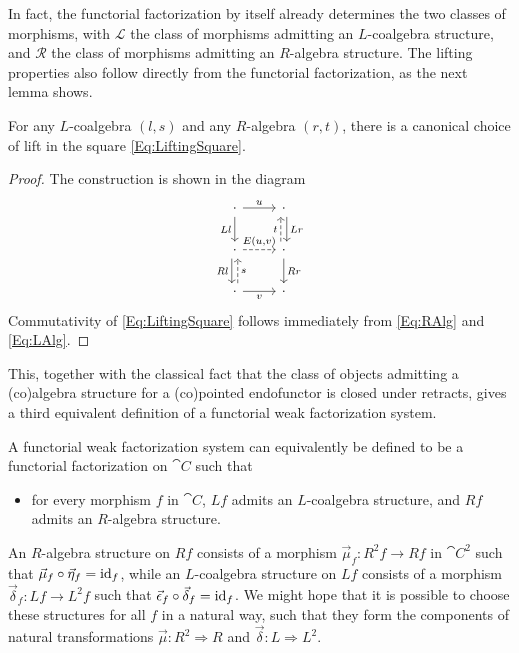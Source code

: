 In fact, the functorial factorization by itself already determines the two classes of morphisms, with $\mathcal{L}$ the class of morphisms admitting an $L$-coalgebra structure, and $\mathcal{R}$ the class of morphisms admitting an $R$-algebra structure. The lifting properties also follow directly from the functorial factorization, as the next lemma shows.

\begin{lemma}
	For any $L$-coalgebra $(l,s)$ and any $R$-algebra $(r,t)$, there is a canonical choice of lift in the square \eqref{Eq:LiftingSquare}.
\end{lemma}
\begin{proof}
	The construction is shown in the diagram
	\begin{equation}\label{Eq:CanonicalLift}
	\begin{tikzcd}
		\cdot 	\rar{u} 
				\dar[swap]{Ll} 
			& \cdot \dar[xshift=0.5ex]{Lr} \\
		\cdot 	\rar[dashed]{E(u,v)} 
				\dar[xshift=-0.5ex][swap]{Rl} 
			& \cdot \uar[xshift=-0.5ex,dashed]{t} 
				\dar{Rr} \\
		\cdot 	\uar[xshift=0.5ex,dashed][swap]{s}
				\rar[swap]{v}
			& \cdot
	\end{tikzcd}
	\end{equation}
	Commutativity of \eqref{Eq:LiftingSquare} follows immediately from \eqref{Eq:RAlg} and \eqref{Eq:LAlg}.
\end{proof}

This, together with the classical fact that the class of objects admitting a (co)algebra structure for a (co)pointed endofunctor is closed under retracts, gives a third equivalent definition of a functorial weak factorization system.

\begin{lemma}
	A functorial weak factorization system can equivalently be defined to be a functorial factorization on $\cat{C}$ such that
	\begin{itemize}
		\item for every morphism $f$ in $\cat{C}$, $Lf$ admits an $L$-coalgebra structure, and $Rf$ admits an $R$-algebra structure.
	\end{itemize}
\end{lemma}

An $R$-algebra structure on $Rf$ consists of a morphism $\vec{\mu}_f\colon R^2f\to Rf$ in $\cat{C}^2$ such that $\vec{\mu}_f\circ\vec{\eta}_f=\operatorname{id}_f$, while an $L$-coalgebra structure on $Lf$ consists of a morphism $\vec{\delta}_f\colon Lf\to L^2f$ such that $\vec{\epsilon}_f\circ\vec{\delta}_f=\operatorname{id}_f$. We might hope that it is possible to choose these structures for all $f$ in a natural way, such that they form the components of natural transformations $\vec{\mu}\colon R^2\Rightarrow R$ and $\vec{\delta}\colon L\Rightarrow L^2$.

